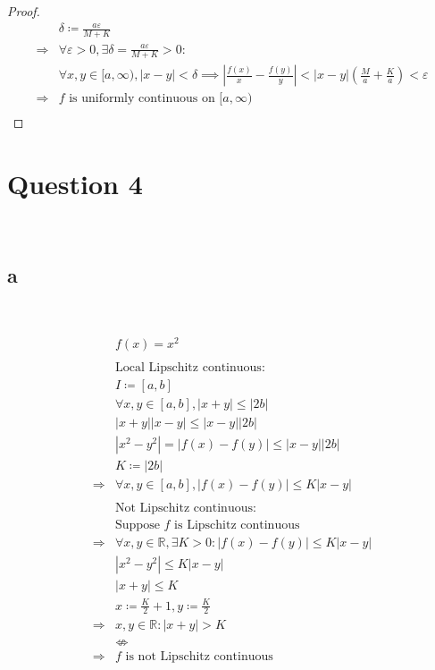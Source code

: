 \documentclass{article}
\begin{document}
\begin{proof}
\begin{align*}
        &\delta\coloneqq \frac{a\varepsilon}{M+K}\\
        \Rightarrow&\forall \varepsilon>0,\exists \delta=\frac{a\varepsilon}{M+K}>0: \\
        &\forall x,y\in[a,\infty),|x-y|<\delta\implies\left|\frac{f(x)}{x}-\frac{f(y)}{y}\right|<|x-y|\left(\frac{M}{a}+\frac{K}{a}\right)<\varepsilon\\
        \Rightarrow&f\text{ is uniformly continuous on }[a,\infty)\\
    \end{align*}
\end{proof}

\newpage

\section*{Question 4}

~

\subsection*{a}

~

\begin{align*}
    &f(x)=x^2\\
    &\\
    &\text{Local Lipschitz continuous}:\\
    &I\coloneqq [a,b]\\
    &\forall x,y\in [a,b],|x+y|\leqslant |2b|\\
    &|x+y||x-y|\leqslant |x-y||2b|\\
    &|x^2-y^2|=|f(x)-f(y)|\leqslant |x-y||2b|\\
    &K\coloneqq |2b|\\
    \Rightarrow&\forall x,y\in[a,b],|f(x)-f(y)|\leqslant K|x-y|\\
    &\\
    &\text{Not Lipschitz continuous}:\\
    &\text{Suppose }f\text{ is Lipschitz continuous}\\
    \Rightarrow&\forall x,y\in \mathbb{R},\exists K>0: |f(x)-f(y)|\leqslant K|x-y|\\
    &|x^2-y^2|\leqslant K|x-y|\\
    &|x+y|\leqslant K\\
    &x\coloneqq \frac{K}{2}+1,y\coloneqq \frac{K}{2}\\
    \Rightarrow&x,y\in\mathbb{R}:|x+y|>K\\
    &\nLeftrightarrow\\
    \Rightarrow&f\text{ is not Lipschitz continuous}\\
\end{align*}
\end{document}
